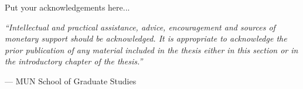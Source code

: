 Put your acknowledgements here...

\vspace{1cm}

\emph{``Intellectual and practical assistance, advice, encouragement and
sources of monetary support should be acknowledged. It is appropriate to
acknowledge the prior publication of any material included in the thesis
either in this section or in the introductory chapter of the thesis.''}

\hfill --- MUN School of Graduate Studies
